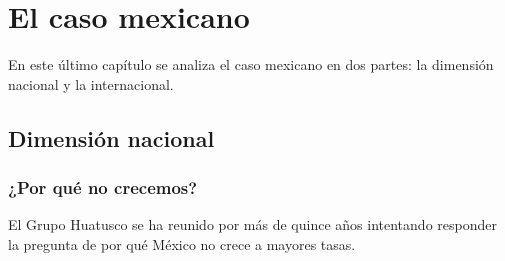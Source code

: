 \chapter{El caso mexicano}

\noindent En este último capítulo se analiza el caso mexicano en dos partes: la dimensión nacional y la internacional. 

\newpage

\section{Dimensión nacional}

\subsection{¿Por qué no crecemos?}

\noindent El Grupo Huatusco se ha reunido por más de quince años intentando responder la pregunta de por qué México no crece a mayores tasas.

